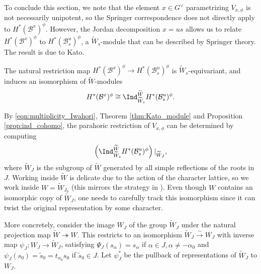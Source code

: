 To conclude this section, we note that the element $x\in G^\vee$ parametrizing $V_{x,\phi}$ is not necessarily unipotent, so the Springer correspondence does not directly apply to $H^*(\mathcal{B}^x)^\phi$. However, the Jordan decomposition $x=us$ allows us to relate $H^*(\mathcal{B}^x)^\phi$ to $H^*(\mathcal{B}_s^u)^\phi$, a $\widetilde{W}_s$-module that can be described by Springer theory. The result is due to Kato.

\begin{proposition}\label{prop:ind_cohomo}\cite{Kato1983}
    The natural restriction map $H^*(\mathcal{B}^x)^\phi\rightarrow H^*(\mathcal{B}_s^u)^\phi$ is $\widetilde{W}_s$-equivariant, and induces an isomorphism of $\widetilde{W}$-modules
    $$H^*(\mathcal{B}^x)^\phi\cong\Ind_{\widetilde{W}_s}^{\widetilde{W}} H^*(\mathcal{B}_s^u)^\phi.$$
\end{proposition}

By \eqref{eqn:multiplicity_Iwahori}, Theorem \ref{thm:Kato_module} and Proposition \ref{prop:ind_cohomo}, the parahoric restriction of $V_{x,\phi}$ can be determined by computing
\begin{equation*}
    \left(\Ind_{\widetilde{W}_s}^{\widetilde{W}}H^*(\mathcal{B}^u_s)^\phi\right)|_{\widetilde{W}_J},
\end{equation*}
where $\widetilde{W}_J$ is the subgroup of $\widetilde{W}$ generated by all simple reflections of the roots in $J$. Working inside $\widetilde{W}$ is delicate due to the action of the character lattice, so we work inside $W=\widetilde{W}_{J_0}$ (this mirrors the strategy in \cite{Reeder2000}). Even though $W$ contains an isomorphic copy of $\widetilde{W}_J$, one needs to carefully track this isomorphism since it can twist the original representation by some character. 

More concretely, consider the image $W_J$ of the group $\widetilde{W}_J$ under the natural projection map $\widetilde{W}\twoheadrightarrow W$. This restricts to an isomorphism $\widetilde{W}_J\overset{\sim}{\rightarrow} W_J$ with inverse map $\psi_J:W_J\rightarrow \widetilde{W}_J$, satisfying $\Psi_J(s_\alpha)=s_\alpha$ if $\alpha\in J, \alpha\neq-\alpha_0$ and $\psi_J(s_0)=\tilde{s}_0=t_{\alpha_0}s_0$ if $\tilde{s}_0\in J$. Let $\psi_J^*$ be the pullback of representations of $\widetilde{W}_J$ to $W_J$.

